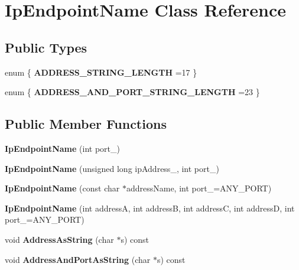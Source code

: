 \hypertarget{class_ip_endpoint_name}{}\section{Ip\+Endpoint\+Name Class Reference}
\label{class_ip_endpoint_name}
\subsection*{Public Types}
\begin{DoxyCompactItemize}
\item 
\mbox{\label{class_ip_endpoint_name_a59d8eecce820d7b3b1f455c49fb3c6c0}} 
enum \{ {\bfseries A\+D\+D\+R\+E\+S\+S\+\_\+\+S\+T\+R\+I\+N\+G\+\_\+\+L\+E\+N\+G\+TH} =17
 \}
\item 
\mbox{\label{class_ip_endpoint_name_a1401a52619dfff5e05726af5c0fc7bc3}} 
enum \{ {\bfseries A\+D\+D\+R\+E\+S\+S\+\_\+\+A\+N\+D\+\_\+\+P\+O\+R\+T\+\_\+\+S\+T\+R\+I\+N\+G\+\_\+\+L\+E\+N\+G\+TH} =23
 \}
\end{DoxyCompactItemize}
\subsection*{Public Member Functions}
\begin{DoxyCompactItemize}
\item 
\mbox{\label{class_ip_endpoint_name_a6a44e1717676450f75fb86e2694ea267}} 
{\bfseries Ip\+Endpoint\+Name} (int port\+\_\+)
\item 
\mbox{\label{class_ip_endpoint_name_a87eeb8c4a4dee940c47c5bf17d23dff9}} 
{\bfseries Ip\+Endpoint\+Name} (unsigned long ip\+Address\+\_\+, int port\+\_\+)
\item 
\mbox{\label{class_ip_endpoint_name_a2e892c9fe40e5e7153594bf57f2eea95}} 
{\bfseries Ip\+Endpoint\+Name} (const char $\ast$address\+Name, int port\+\_\+=A\+N\+Y\+\_\+\+P\+O\+RT)
\item 
\mbox{\label{class_ip_endpoint_name_a64829fd7c9fd2333f388ad86d0a1c5c2}} 
{\bfseries Ip\+Endpoint\+Name} (int addressA, int addressB, int addressC, int addressD, int port\+\_\+=A\+N\+Y\+\_\+\+P\+O\+RT)
\item 
\mbox{\label{class_ip_endpoint_name_a9a828053093361588326261f51602b49}} 
void {\bfseries Address\+As\+String} (char $\ast$s) const
\item 
\mbox{\label{class_ip_endpoint_name_a30e0cbe8131d0b0101feb47c74e274af}} 
void {\bfseries Address\+And\+Port\+As\+String} (char $\ast$s) const
\end{DoxyCompactItemize}
